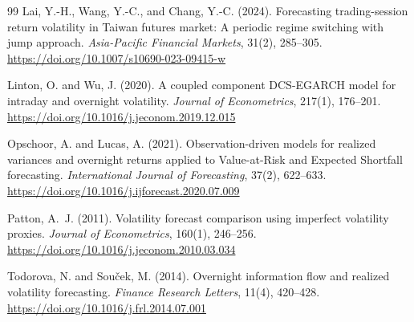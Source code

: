 \documentclass[11pt,a4paper]{article}
\begin{document}
\begin{thebibliography}{99}
Lai, Y.-H., Wang, Y.-C., and Chang, Y.-C. (2024).
\newblock Forecasting trading-session return volatility in Taiwan futures market:
A periodic regime switching with jump approach.
\newblock \emph{Asia-Pacific Financial Markets}, 31(2), 285--305.
\newblock \url{https://doi.org/10.1007/s10690-023-09415-w}

Linton, O. and Wu, J. (2020).
\newblock A coupled component DCS-EGARCH model for intraday and overnight volatility.
\newblock \emph{Journal of Econometrics}, 217(1), 176--201.
\newblock \url{https://doi.org/10.1016/j.jeconom.2019.12.015}

Opschoor, A. and Lucas, A. (2021).
\newblock Observation-driven models for realized variances and overnight returns applied to Value-at-Risk and Expected Shortfall forecasting.
\newblock \emph{International Journal of Forecasting}, 37(2), 622--633.
\newblock \url{https://doi.org/10.1016/j.ijforecast.2020.07.009}

Patton, A.~J. (2011).
\newblock Volatility forecast comparison using imperfect volatility proxies.
\newblock \emph{Journal of Econometrics}, 160(1), 246--256.
\newblock \url{https://doi.org/10.1016/j.jeconom.2010.03.034}

Todorova, N. and Sou\v{c}ek, M. (2014).
\newblock Overnight information flow and realized volatility forecasting.
\newblock \emph{Finance Research Letters}, 11(4), 420--428.
\newblock \url{https://doi.org/10.1016/j.frl.2014.07.001}

\end{thebibliography}
\end{document}

